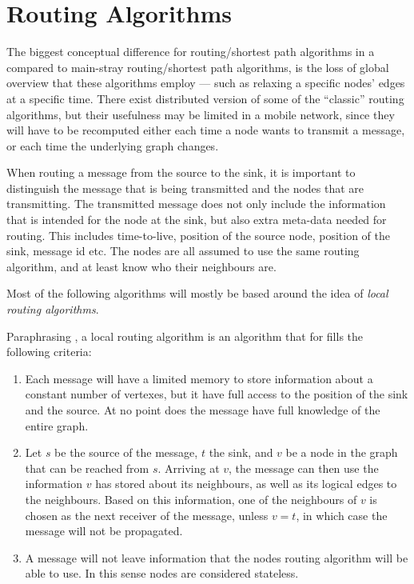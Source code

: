 \documentclass[letter, 12pt, english, draft]{article}
\begin{document}
\section{Routing Algorithms}

The biggest conceptual difference for routing/shortest path algorithms in a \manet compared to main-stray routing/shortest path algorithms, is the loss of global overview that these algorithms employ --- such as relaxing a specific nodes' edges at a specific time. There exist distributed version of some of the ``classic'' routing algorithms, but their usefulness may be limited in a mobile network, since they will have to be recomputed either each time a node wants to transmit a message, or each time the underlying graph changes.

When routing a message from the source to the sink, it is important to distinguish the message that is being transmitted and the nodes that are transmitting. The transmitted message does not only include the information that is intended for the node at the sink, but also extra meta-data needed for routing. This includes time-to-live, position of the source node, position of the sink, message id etc. The nodes are all assumed to use the same routing algorithm, and at least know who their neighbours are.

Most of the following algorithms will mostly be based around the idea of \emph{local routing algorithms}. 

Paraphrasing \cite{compass}, a local routing algorithm is an algorithm that for fills the following criteria:
\begin{enumerate}
\item Each message will have a limited memory to store information about a constant number of vertexes, but it have full access to the position of the sink and the source. At no point does the message have full knowledge of the entire graph. 
\item Let $s$ be the source of the message, $t$ the sink, and $v$ be a node in the graph that can be reached from $s$. Arriving at $v$, the message can then use the information $v$ has stored about its neighbours, as well as its logical edges to the neighbours. Based on this information, one of the neighbours of $v$ is chosen as the next receiver of the message, unless $v = t$, in which case the message will not be propagated.
\item A message will not leave information that the nodes routing algorithm will be able to use. In this sense nodes are considered stateless.\end{enumerate}
\end{document}
